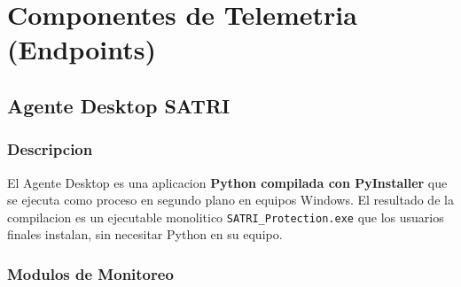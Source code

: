 \documentclass[12pt, a4paper]{report}
\begin{document}
\chapter{Componentes de Telemetria (Endpoints)}

\section{Agente Desktop SATRI}

\subsection{Descripcion}
El Agente Desktop es una aplicacion \textbf{Python compilada con PyInstaller} que se ejecuta como proceso en segundo plano en equipos Windows. El resultado de la compilacion es un ejecutable monolitico \texttt{SATRI\_Protection.exe} que los usuarios finales instalan, sin necesitar Python en su equipo.

\subsection{Modulos de Monitoreo}
\end{document}

